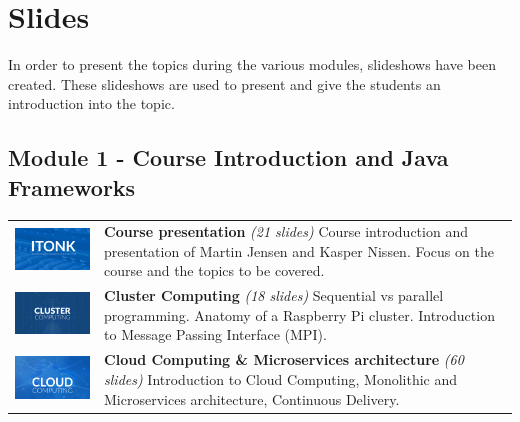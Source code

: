 
\section*{Slides}

In order to present the topics during the various modules, slideshows have been created. These slideshows are used to present and give the students an introduction into the topic. 


\subsection*{Module 1 - Course Introduction and Java Frameworks}

\renewcommand*{\arraystretch}{2}
\begin{tabular}{p{6cm}p{7.5cm}}

\includegraphics[align=t,width=6cm]{figures/slides/slides_w1_presentation_of_kn_mj} & \textbf{Course presentation} \newline \textit{(21 slides)} \newline Course introduction and presentation of Martin Jensen and Kasper Nissen. Focus on the course and the topics to be covered. \\ 

\includegraphics[align=t,width=6cm]{figures/slides/slides_w1_cluster_computing} & \textbf{Cluster Computing} \newline \textit{(18 slides)} \newline Sequential vs parallel programming. Anatomy of a Raspberry Pi cluster. Introduction to Message Passing Interface (MPI). \\ 

\includegraphics[align=t,width=6cm]{figures/slides/slide_w1_cloud_computing} & \textbf{Cloud Computing \& Microservices architecture} \newline \textit{(60 slides)} \newline Introduction to Cloud Computing, Monolithic and Microservices architecture, Continuous Delivery. \\ 
\end{tabular}
